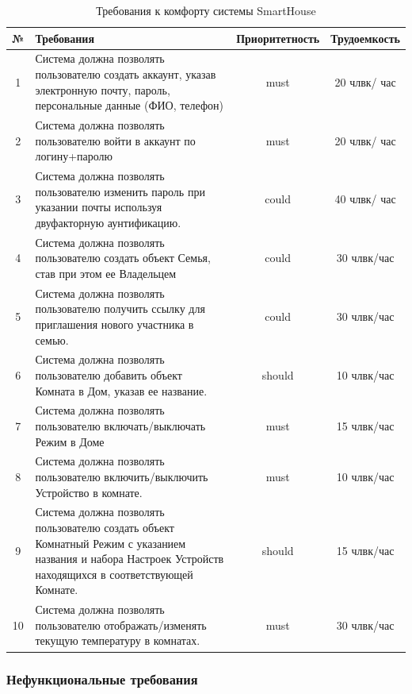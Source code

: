\documentclass{article}
\begin{document}
\begin{table}[H]
    \centering
    \begin{tabular}{|c|p{7cm}|c|c|}
    \hline
        № & Требования & Приоритетность & Трудоемкость \\ \hline
        1 & Система должна позволять пользователю создать аккаунт, указав электронную почту, пароль, персональные данные (ФИО, телефон) & must & 20 члвк/ час \\ \hline
        2 & Система должна позволять пользователю войти в аккаунт по логину+паролю & must & 20 члвк/ час \\ \hline
        3 & Система должна позволять пользователю изменить пароль при указании почты используя двуфакторную аунтификацию.  & could & 40 члвк/ час \\ \hline
        4 & Система должна позволять пользователю создать объект Семья, став при этом ее Владельцем & could & 30 члвк/час \\ \hline
        5 & Система должна позволять пользователю получить ссылку для приглашения нового участника в семью.     & could & 30 члвк/час \\ \hline
        6 & Система должна позволять пользователю добавить объект Комната в Дом, указав ее название.    & should & 10 члвк/час \\ \hline
        7 &  Система должна позволять пользователю включать/выключать Режим в Доме          & must & 15  члвк/час \\ \hline
        8 &  Система должна позволять пользователю включить/выключить Устройство в комнате.    & must & 10 члвк/час \\ \hline
        9 & Система должна позволять пользователю создать объект Комнатный Режим с указанием названия и набора Настроек Устройств находящихся в соответствующей Комнате.  & should & 15 члвк/час \\ \hline
        10 & Система должна позволять пользователю отображать/изменять текущую температуру в комнатах. & must & 30 члвк/час \\ \hline
    \end{tabular}
    \caption{Требования к комфорту системы SmartHouse}
\end{table}


\subsubsection{Нефункциональные требования}
\end{document}
